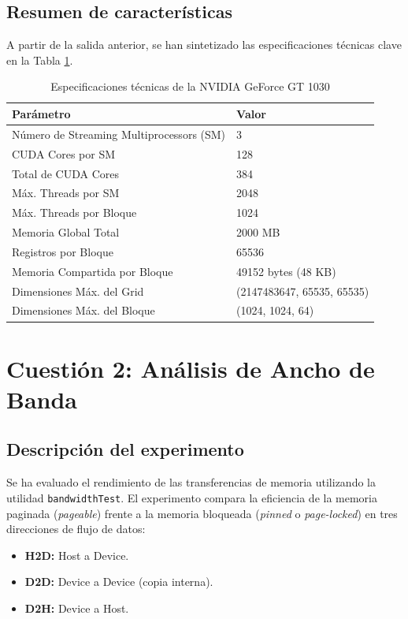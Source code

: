 \documentclass[12pt,a4paper]{report}
\begin{document}
\subsection{Resumen de características}
A partir de la salida anterior, se han sintetizado las especificaciones técnicas clave en la Tabla \ref{tab:gpu_specs}.

\begin{table}[H]
\centering
\caption{Especificaciones técnicas de la NVIDIA GeForce GT 1030}
\label{tab:gpu_specs}
\begin{tabular}{l l}
    \toprule
    \textbf{Parámetro} & \textbf{Valor} \\
    \midrule
    Número de Streaming Multiprocessors (SM) & 3 \\
    CUDA Cores por SM & 128 \\
    Total de CUDA Cores & 384 \\
    Máx. Threads por SM & 2048 \\
    Máx. Threads por Bloque & 1024 \\
    Memoria Global Total & 2000 MB \\
    Registros por Bloque & 65536 \\
    Memoria Compartida por Bloque & 49152 bytes (48 KB) \\
    Dimensiones Máx. del Grid & (2147483647, 65535, 65535) \\
    Dimensiones Máx. del Bloque & (1024, 1024, 64) \\
    \bottomrule
\end{tabular}
\end{table}

\section{Cuestión 2: Análisis de Ancho de Banda}

\subsection{Descripción del experimento}
Se ha evaluado el rendimiento de las transferencias de memoria utilizando la utilidad \texttt{bandwidthTest}. El experimento compara la eficiencia de la memoria paginada (\textit{pageable}) frente a la memoria bloqueada (\textit{pinned} o \textit{page-locked}) en tres direcciones de flujo de datos:
\begin{itemize}
    \item \textbf{H2D:} Host a Device.
    \item \textbf{D2D:} Device a Device (copia interna).
    \item \textbf{D2H:} Device a Host.
\end{itemize}
\end{document}
